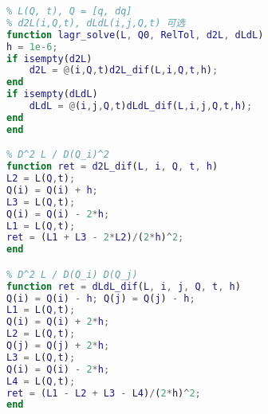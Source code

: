\begin{lstlisting}[language=matlab, caption=lagr\_solve.m]
% 数值解拉格朗日方程
% L(Q, t), Q = [q, dq]
% d2L(i,Q,t), dLdL(i,j,Q,t) 可选
function lagr_solve(L, Q0, RelTol, d2L, dLdL)
h = 1e-6;
if isempty(d2L)
    d2L = @(i,Q,t)d2L_dif(L,i,Q,t,h);
end
if isempty(dLdL)
    dLdL = @(i,j,Q,t)dLdL_dif(L,i,j,Q,t,h);
end
end

% D^2 L / D(Q_i)^2
function ret = d2L_dif(L, i, Q, t, h)
L2 = L(Q,t);
Q(i) = Q(i) + h;
L3 = L(Q,t);
Q(i) = Q(i) - 2*h;
L1 = L(Q,t);
ret = (L1 + L3 - 2*L2)/(2*h)^2;
end

% D^2 L / D(Q_i) D(Q_j)
function ret = dLdL_dif(L, i, j, Q, t, h)
Q(i) = Q(i) - h; Q(j) = Q(j) - h;
L1 = L(Q,t);
Q(i) = Q(i) + 2*h;
L2 = L(Q,t);
Q(j) = Q(j) + 2*h;
L3 = L(Q,t);
Q(i) = Q(i) - 2*h;
L4 = L(Q,t);
ret = (L1 - L2 + L3 - L4)/(2*h)^2;
end
\end{lstlisting}
